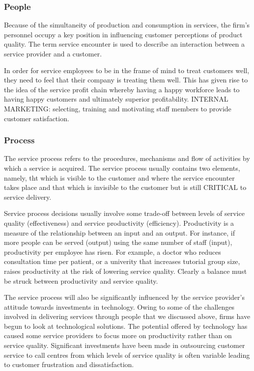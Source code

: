 \documentclass{article}
\begin{document}
\subsubsection*{People}
Because of the simultaneity of production and consumption in services, the firm's personnel occupy a key position in influencing customer perceptions of product quality. The term service encounter is used to describe an interaction between a service provider and a customer. 

In order for service employees to be in the frame of mind to treat customers well, they need to feel that their company is treating them well. This has given rise to the idea of the service profit chain whereby having a happy workforce leads to having happy customers and ultimately superior profitability. INTERNAL MARKETING: selecting, training and motivating staff members to provide customer satisfaction. 

\subsubsection*{Process}
The service process refers to the procedures, mechanisms and flow of activities by which a service is acquired. The service process usually contains two elements, namely, tht which is visible to the customer and where the service encounter takes place and that which is invisible to the customer but is still CRITICAL to service delivery.

Service process decisions usually involve some trade-off between levels of service quality (effectiveness) and service productivity (efficiency). Productivity is a measure of the relationship between an input and an output. For instance, if more people can be served (output) using the same number of staff (input), productivity per employee has risen. For example, a doctor who reduces consultation time per patient, or a univerity that increases tutorial group size, raises productivity at the risk of lowering service quality. Clearly a balance must be struck between productivity and service quality. 

The service process will also be significantly influenced by the service provider's attitude towards investments in technology. Owing to some of the challenges involved in delivering services through people that we discussed above, firms have begun to look at technological solutions. The potential offered by technology has caused some service providers to focus more on productivity rather than on service quality. Significant investments have been made in outsourcing customer service to call centres from which levels of service quality is often variable leading to customer frustration and dissatisfaction.
\end{document}
